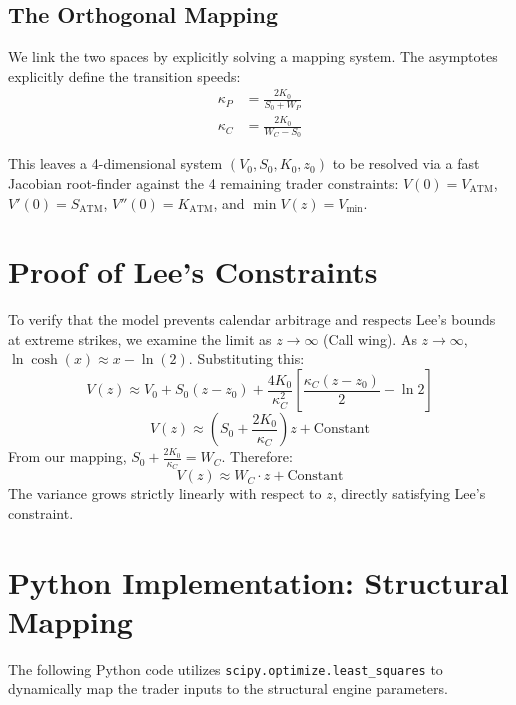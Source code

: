 \documentclass[11pt, a4paper]{article}
\begin{document}
\subsection{The Orthogonal Mapping}
We link the two spaces by explicitly solving a mapping system. The asymptotes explicitly define the transition speeds:
\begin{align}
\kappa_P &= \frac{2K_0}{S_0 + W_P} \\
\kappa_C &= \frac{2K_0}{W_C - S_0}
\end{align}

This leaves a 4-dimensional system $(V_0, S_0, K_0, z_0)$ to be resolved via a fast Jacobian root-finder against the 4 remaining trader constraints: $V(0) = V_{\text{ATM}}$, $V'(0) = S_{\text{ATM}}$, $V''(0) = K_{\text{ATM}}$, and $\min V(z) = V_{\text{min}}$.

\section{Proof of Lee's Constraints}
To verify that the model prevents calendar arbitrage and respects Lee's bounds at extreme strikes, we examine the limit as $z \to \infty$ (Call wing). As $z \to \infty$, $\ln \cosh(x) \approx x - \ln(2)$. Substituting this:
\begin{equation}
V(z) \approx V_0 + S_0(z - z_0) + \frac{4K_0}{\kappa_C^2} \left[ \frac{\kappa_C (z - z_0)}{2} - \ln 2 \right]
\end{equation}
\begin{equation}
V(z) \approx \left( S_0 + \frac{2K_0}{\kappa_C} \right) z + \text{Constant}
\end{equation}
From our mapping, $S_0 + \frac{2K_0}{\kappa_C} = W_C$. Therefore:
\begin{equation}
V(z) \approx W_C \cdot z + \text{Constant}
\end{equation}
The variance grows strictly linearly with respect to $z$, directly satisfying Lee's constraint.

\newpage
\section{Python Implementation: Structural Mapping}
The following Python code utilizes \texttt{scipy.optimize.least\_squares} to dynamically map the trader inputs to the structural engine parameters.
\end{document}
